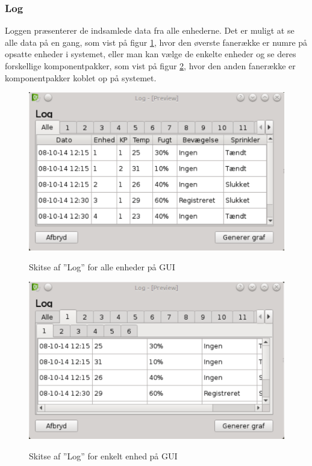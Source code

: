 \subsubsection{Log}
Loggen præsenterer de indsamlede data fra alle enhederne. Det er muligt at se alle data på en gang, som vist på figur \ref{fig:GUI-log-alle}, hvor den øverste fanerække er numre på opsatte enheder i systemet, eller man kan vælge de enkelte enheder og se deres forskellige komponentpakker, som vist på figur \ref{fig:GUI-log-enhed}, hvor den anden fanerække er komponentpakker koblet op på systemet.

\begin{figure}[htbp] \centering
{\includegraphics[scale=0.5]{filer/pics/GUI/Log-alle}}
\caption{Skitse af ''Log'' for alle enheder på GUI}
\label{fig:GUI-log-alle}
\end{figure}

\begin{figure}[htbp] \centering
{\includegraphics[scale=0.5]{filer/pics/GUI/Log-enhed}}
\caption{Skitse af ''Log'' for enkelt enhed på GUI}
\label{fig:GUI-log-enhed}
\end{figure}




